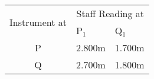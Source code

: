 \begin{tabular}{|c|p{3cm}|p{3cm}|}
    \hline
    \multirow{2}{*}{Instrument at} & \multicolumn{2}{|c|}{Staff Reading at}\\
    \cline{2-3}
    & P$_1$ & Q$_1$ \\
    \hline
    P & 2.800m & 1.700m\\
    \hline
    Q & 2.700m & 1.800m\\
    \hline
\end{tabular}